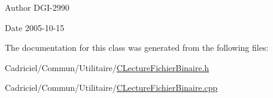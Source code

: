 \begin{DoxyAuthor}{Author}
D\-G\-I-\/2990 
\end{DoxyAuthor}
\begin{DoxyDate}{Date}
2005-\/10-\/15 
\end{DoxyDate}


The documentation for this class was generated from the following files\-:\begin{DoxyCompactItemize}
\item 
Cadriciel/\-Commun/\-Utilitaire/\hyperlink{_c_lecture_fichier_binaire_8h}{C\-Lecture\-Fichier\-Binaire.\-h}\item 
Cadriciel/\-Commun/\-Utilitaire/\hyperlink{_c_lecture_fichier_binaire_8cpp}{C\-Lecture\-Fichier\-Binaire.\-cpp}\end{DoxyCompactItemize}
